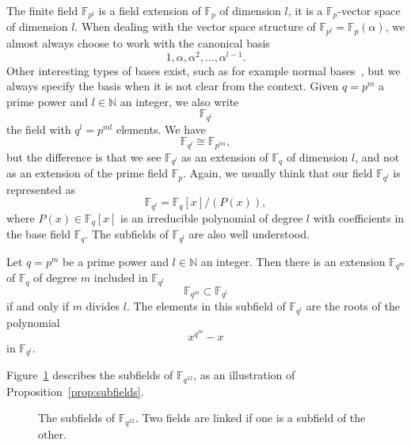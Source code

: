 The finite field $\mathbb{F}_{p^l}$ is a
field extension of $\mathbb{F}_{p}$ of dimension $l$, \ie it is a
$\mathbb{F}_{p}$-vector space of dimension $l$. When dealing with the vector
space structure of $\mathbb{F}_{p^l}=\mathbb{F}_{p}(\alpha)$, we almost always choose to work with the
canonical basis 
\[
  1, \alpha, \alpha^2, \dots, \alpha^{l-1}.
\]
Other interesting types of bases exist, such as for example normal
bases~\cite{Gao93}, but we always specify the basis when it is not clear from
the context.
Given $q=p^m$ a prime power and
$l\in\mathbb{N}$ an integer, we also write 
\[
  \mathbb{F}_{q^l}
\]
the field with $q^l = p^{ml}$ elements. We have
\[
  \mathbb{F}_{q^l}\cong\mathbb{F}_{p^{lm}},
\]
but the difference is that we see $\mathbb{F}_{q^l}$ as an extension of
$\mathbb{F}_{q}$ of dimension $l$, and not as an extension of the prime field
$\mathbb{F}_p$. Again, we usually think that our field $\mathbb{F}_{q^l}$ is
represented as
\[
  \mathbb{F}_{q^l}=\mathbb{F}_q[x]/(P(x)),
\]
where $P(x)\in\mathbb{F}_{q}[x]$ is an irreducible polynomial of degree $l$ with
coefficients in the base field $\mathbb{F}_q$. The subfields of
$\mathbb{F}_{q^l}$ are also well understood.
\begin{prop}
  \label{prop:subfields}
  Let $q=p^m$ be a prime power and $l\in\mathbb{N}$ an integer. Then there is
  an extension $\mathbb{F}_{q^m}$ of $\mathbb{F}_q$ of degree $m$ 
  included in $\mathbb{F}_{q^l}$
  \[
    \mathbb{F}_{q^m}\subset\mathbb{F}_{q^l}
  \]
  if and only if $m$ divides
  $l$. The elements in this subfield of $\mathbb{F}_{q^l}$ are the roots of the
  polynomial
  \[
    x^{q^m}-x
  \]
  in $\mathbb{F}_{q^l}$.
\end{prop}
Figure~\ref{fig:F12} describes the subfields of $\mathbb{F}_{q^{12}}$, as an
illustration of Proposition~\ref{prop:subfields}.
\begin{figure}
  \centering
  \caption{The subfields of $\mathbb{F}_{q^{12}}$. Two fields are linked if one is a
subfield of the other.}
  \label{fig:F12}
\end{figure}
